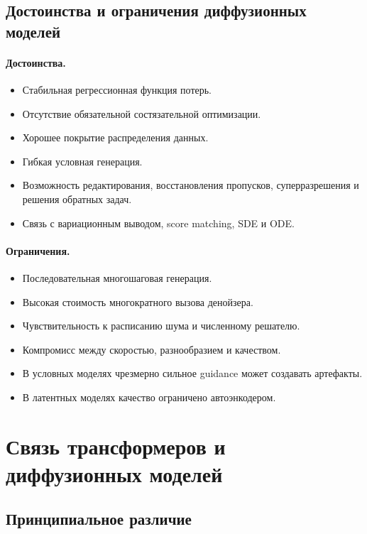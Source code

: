 \documentclass[12pt,a4paper]{article}
\theoremstyle{definition}
\newcommand{\1}{\mathbf{1}}
\begin{document}
\subsection{Достоинства и ограничения диффузионных моделей}

\paragraph{Достоинства.}
\begin{itemize}
    \item Стабильная регрессионная функция потерь.
    \item Отсутствие обязательной состязательной оптимизации.
    \item Хорошее покрытие распределения данных.
    \item Гибкая условная генерация.
    \item Возможность редактирования, восстановления пропусков,
    суперразрешения и решения обратных задач.
    \item Связь с вариационным выводом, score matching, SDE и ODE.
\end{itemize}

\paragraph{Ограничения.}
\begin{itemize}
    \item Последовательная многошаговая генерация.
    \item Высокая стоимость многократного вызова денойзера.
    \item Чувствительность к расписанию шума и численному решателю.
    \item Компромисс между скоростью, разнообразием и качеством.
    \item В условных моделях чрезмерно сильное guidance может создавать
    артефакты.
    \item В латентных моделях качество ограничено автоэнкодером.
\end{itemize}

\section{Связь трансформеров и диффузионных моделей}

\subsection{Принципиальное различие}
\end{document}
